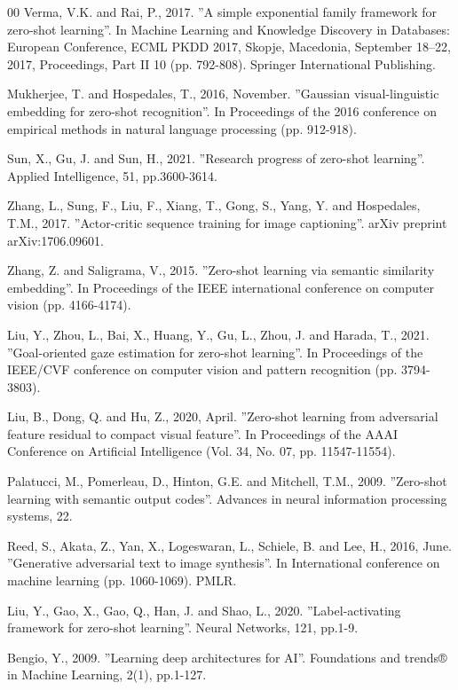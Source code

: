 \documentclass{article}
\begin{document}
\begin{thebibliography}{00}
 Verma, V.K. and Rai, P., 2017. ''A simple exponential family framework for zero-shot learning''. In Machine Learning and Knowledge Discovery in Databases: European Conference, ECML PKDD 2017, Skopje, Macedonia, September 18–22, 2017, Proceedings, Part II 10 (pp. 792-808). Springer International Publishing.

 Mukherjee, T. and Hospedales, T., 2016, November. ''Gaussian visual-linguistic embedding for zero-shot recognition''. In Proceedings of the 2016 conference on empirical methods in natural language processing (pp. 912-918).

 Sun, X., Gu, J. and Sun, H., 2021. ''Research progress of zero-shot learning''. Applied Intelligence, 51, pp.3600-3614.

 Zhang, L., Sung, F., Liu, F., Xiang, T., Gong, S., Yang, Y. and Hospedales, T.M., 2017. ''Actor-critic sequence training for image captioning''. arXiv preprint arXiv:1706.09601.

 Zhang, Z. and Saligrama, V., 2015. ''Zero-shot learning via semantic similarity embedding''. In Proceedings of the IEEE international conference on computer vision (pp. 4166-4174).

 Liu, Y., Zhou, L., Bai, X., Huang, Y., Gu, L., Zhou, J. and Harada, T., 2021. ''Goal-oriented gaze estimation for zero-shot learning''. In Proceedings of the IEEE/CVF conference on computer vision and pattern recognition (pp. 3794-3803).

 Liu, B., Dong, Q. and Hu, Z., 2020, April. ''Zero-shot learning from adversarial feature residual to compact visual feature''. In Proceedings of the AAAI Conference on Artificial Intelligence (Vol. 34, No. 07, pp. 11547-11554).

 Palatucci, M., Pomerleau, D., Hinton, G.E. and Mitchell, T.M., 2009. ''Zero-shot learning with semantic output codes''. Advances in neural information processing systems, 22.

 Reed, S., Akata, Z., Yan, X., Logeswaran, L., Schiele, B. and Lee, H., 2016, June. ''Generative adversarial text to image synthesis''. In International conference on machine learning (pp. 1060-1069). PMLR.

 Liu, Y., Gao, X., Gao, Q., Han, J. and Shao, L., 2020. ''Label-activating framework for zero-shot learning''. Neural Networks, 121, pp.1-9.

 Bengio, Y., 2009. ''Learning deep architectures for AI''. Foundations and trends® in Machine Learning, 2(1), pp.1-127.


\end{thebibliography}
\end{document}
